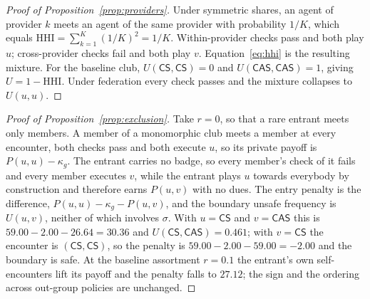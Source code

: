 \documentclass[11pt,a4paper]{article}
\theoremstyle{definition}
\newcommand{\CS}{\textsf{CS}}
\newcommand{\CAS}{\textsf{CAS}}
\begin{document}
\begin{proof}[Proof of Proposition~\ref{prop:providers}]
Under symmetric shares, an agent of provider $k$ meets an agent of the same
provider with probability $1/K$, which equals
$\mathrm{HHI} = \sum_{k=1}^{K} (1/K)^{2} = 1/K$.
Within-provider checks pass and both play $u$; cross-provider checks
fail and both play $v$. Equation~\eqref{eq:hhi} is the resulting mixture. For
the baseline club, $U(\CS, \CS) = 0$ and $U(\CAS, \CAS) = 1$, giving
$U = 1 - \mathrm{HHI}$. Under federation every check passes and the mixture
collapses to $U(u,u)$.
\end{proof}

\begin{proof}[Proof of Proposition~\ref{prop:exclusion}]
Take $r = 0$, so that a rare entrant meets only members. A member of a
monomorphic club meets a member at every encounter, both checks pass and both
execute $u$, so its private payoff is $P(u,u) - \kappa_g$. The entrant carries
no badge, so every member's check of it fails and every member executes $v$,
while the entrant plays $u$ towards everybody by construction and therefore
earns $P(u,v)$ with no dues. The entry penalty is the difference,
$P(u,u) - \kappa_g - P(u,v)$, and the boundary unsafe frequency is $U(u,v)$,
neither of which involves $\sigma$. With $u = \CS$ and $v = \CAS$ this is
$59.00 - 2.00 - 26.64 = 30.36$ and $U(\CS, \CAS) = 0.461$; with $v = \CS$ the
encounter is $(\CS, \CS)$, so the penalty is $59.00 - 2.00 - 59.00 = -2.00$
and the boundary is safe. At the baseline assortment $r = 0.1$ the entrant's
own self-encounters lift its payoff and the penalty falls to $27.12$; the sign
and the ordering across out-group policies are unchanged.
\end{proof}
\end{document}
